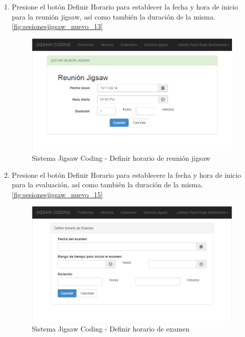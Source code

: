 \begin{enumerate}
\begin{figure}[h!]
	\end{figure}
	\item Presione el botón Definir Horario para establecer la fecha y hora de inicio para la reunión jigsaw, así como también la duración de la misma. \autoref{fig:sesionesjigsaw_nuevo_13}
	\begin{figure}[h!]
		\centering
		\caption{Sistema Jigsaw Coding - Definir horario de reunión jigsaw}
		\label{fig:sesionesjigsaw_nuevo_13}
		\includegraphics[scale=0.5]{figuras/usodelsistema/docente/sesionesjigsaw_nuevo_13}
	\end{figure}
	\item Presione el botón Definir Horario para establecere la fecha y hora de inicio para la evaluación, así como también la duración de la misma. \autoref{fig:sesionesjigsaw_nuevo_15}
	\begin{figure}[h!]
		\centering
		\caption{Sistema Jigsaw Coding - Definir horario de examen}
		\label{fig:sesionesjigsaw_nuevo_15}
		\includegraphics[scale=0.5]{figuras/usodelsistema/docente/sesionesjigsaw_nuevo_15}
	\end{figure}
\end{enumerate}

